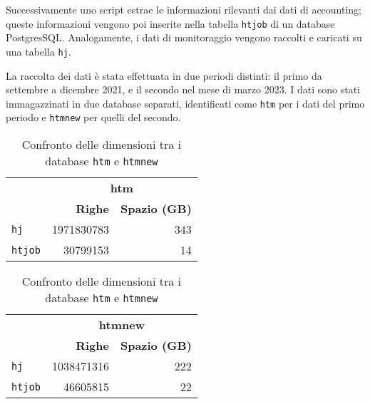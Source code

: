 Successivamente uno script estrae le informazioni rilevanti dai dati di
accounting; queste informazioni vengono poi inserite nella tabella
\texttt{htjob} di un database PostgresSQL. Analogamente, i dati di
monitoraggio vengono raccolti e caricati su una tabella \texttt{hj}.

La raccolta dei dati è stata effettuata in due periodi distinti: il primo da
settembre a dicembre 2021, e il secondo nel mese di marzo 2023. I dati sono
stati immagazzinati in due database separati, identificati come \texttt{htm}
per i dati del primo periodo e \texttt{htmnew} per quelli del secondo.

\begin{table}[!htbp]
    \centering 
    \begin{tabular}{
      lrr
    }
        \toprule 
        & \multicolumn{2}{c}{\textbf{htm}} \\
        \cmidrule{2-3}
        & {\textbf{Righe}} & {\textbf{Spazio (GB)}} \\ 
        \midrule
        \texttt{hj}      & 1971830783 & 343 \\
        \texttt{htjob}   & 30799153 & 14 \\
        \bottomrule
    \end{tabular}
    \hspace*{1cm}
    \begin{tabular}{lrr}
        \toprule
        & \multicolumn{2}{c}{\textbf{htmnew}} \\
        \cmidrule{2-3}
        & {\textbf{Righe}} & {\textbf{Spazio (GB)}} \\
        \midrule
        \texttt{hj}      & 1038471316 & 222 \\
        \texttt{htjob}   & 46605815 & 22 \\
        \bottomrule
    \end{tabular}
    \caption{Confronto delle dimensioni tra i database \texttt{htm} e \texttt{htmnew}}
    \label{table:database_comparison}
\end{table}

